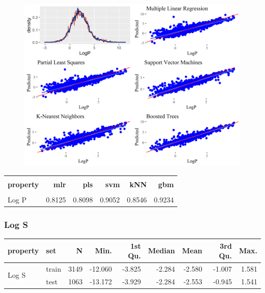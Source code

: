 \documentclass[10pt, letter]{article}
\renewcommand{\=}{\, =\, }
\newcommand{\+}{\, +\, }
\renewcommand{\-}{\, -\, }
\begin{document}
\begin{figure}[H]
  \centering
    \includegraphics[width=1.0\textwidth]{LogP_plots.png}
\end{figure}

\begin{table}[H]
\begin{center}
\begin{tabular}{lrrrrr}
\toprule
&&\\
{\bf property} & {\bf mlr} & {\bf pls} &  {\bf svm}  & {\bf kNN}  & {\bf gbm}\\
\midrule
&&\\
Log P  &   0.8125 & 0.8098 & 0.9052 & 0.8546 & 0.9234\\
\midrule
\hline
\end{tabular}
\end{center}
\end{table}

\subsubsection{Log S}

\begin{table}[H]
\begin{center}
\begin{tabular}{llrrrrrrr}
\toprule
{\bf property} & {\bf set} & {\bf N} & {\bf Min.} & {\bf 1st Qu.} &  {\bf Median}  & {\bf Mean}  & {\bf 3rd Qu.} & {\bf Max.}\\
\midrule
\multirow{2}{15mm}{Log S}
& train &  3149 & -12.060 & -3.825 & -2.284 & -2.580 & -1.007 & 1.581\\
& test &  1063 & -13.172 & -3.929 & -2.284 & -2.553 & -0.945 & 1.541\\
\midrule
\hline
\end{tabular}
\end{center}
\end{table}
\end{document}
